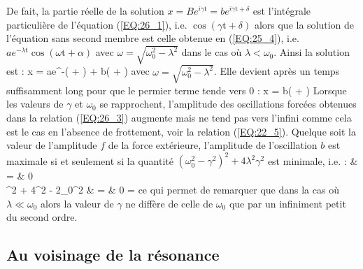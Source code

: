 De fait, la partie r\'{e}elle de la solution $x = Be^{i\gamma\mathrm{t}} = be^{i\gamma\mathrm{t} + \delta}$ est l'int\'{e}grale particuli\`{e}re de l'\'{e}quation (\ref{EQ:26_1}), i.e. $\cos(\gamma\mathrm{t} + \delta)$ alors que la solution de l'\'{e}quation sans second membre est celle obtenue en (\ref{EQ:25_4}), i.e. $ae^{-\lambda\mathrm{t}}\cos(\omega\mathrm{t} + \alpha)$ avec $\omega = \sqrt{\omega_{0}^{2} - \lambda^{2}}$ dans le cas o\`{u} $\lambda < \omega_{0}$. Ainsi la solution est :
\be
	x = ae^{-\lambda{}}\cos(\omega{} + \alpha) + b\cos(\gamma{} + \delta) \label{EQ:26_4}
\ee
avec $\omega = \sqrt{\omega_{0}^{2} - \lambda^{2}}$. Elle devient après un temps suffisamment long pour que le permier terme tende vers 0 :
\be
	x = b\cos(\gamma{} + \delta) \label{EQ:26_5}
\ee
Lorsque les valeurs de $\gamma$ et $\omega_{0}$ se rapprochent, l'amplitude des oscillations forc\'{e}es obtenues dans la relation (\ref{EQ:26_3}) augmente mais ne tend pas vers l'infini comme cela est le cas en l'absence de frottement, voir la relation (\ref{EQ:22_5}). Quelque soit la valeur de l'amplitude $f$ de la force ext\'{e}rieure, l'amplitude de l'oscillation $b$ est maximale si et seulement si la quantit\'{e} $(\omega_{0}^{2} - \gamma^{2})^{2} + 4\lambda^{2}\gamma^{2}$ est minimale, i.e. :
\bea
	 & = & 0 \nonumber \\
	\gamma^{2} + 4\lambda^{2} - 2\omega_{0}^{2} & = & 0 \Leftrightarrow \gamma =  \nonumber
\eea
ce qui permet de remarquer que dans la cas o\`{u} $\lambda \ll \omega_{0}$ alors la valeur de $\gamma$ ne diff\`{e}re de celle de $\omega_{0}$ que par un infiniment petit du second ordre.

\subsection{Au voisinage de la r\'{e}sonance}

